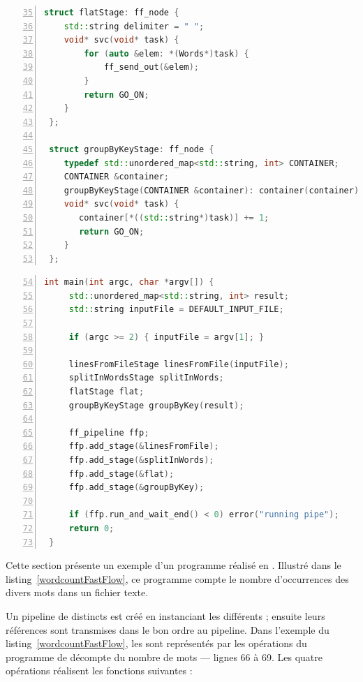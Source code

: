 \begin{lstlisting}[language=c++, frame=single,float,numbers=left,firstnumber=35]
 struct flatStage: ff_node {
    std::string delimiter = " ";
    void* svc(void* task) {
        for (auto &elem: *(Words*)task) {
            ff_send_out(&elem);
        }
        return GO_ON;
    }
 };
 
 struct groupByKeyStage: ff_node {
    typedef std::unordered_map<std::string, int> CONTAINER;
    CONTAINER &container;
    groupByKeyStage(CONTAINER &container): container(container){}
    void* svc(void* task) {
       container[*((std::string*)task)] += 1;
       return GO_ON;
    }
 };
\end{lstlisting}
 
\begin{lstlisting}[language=c++, frame=single, float, numbers=left,firstnumber=54]
 int main(int argc, char *argv[]) {
     std::unordered_map<std::string, int> result;
     std::string inputFile = DEFAULT_INPUT_FILE;

     if (argc >= 2) { inputFile = argv[1]; } 

     linesFromFileStage linesFromFile(inputFile);
     splitInWordsStage splitInWords;
     flatStage flat;
     groupByKeyStage groupByKey(result);

     ff_pipeline ffp;
     ffp.add_stage(&linesFromFile);
     ffp.add_stage(&splitInWords);
     ffp.add_stage(&flat);
     ffp.add_stage(&groupByKey);

     if (ffp.run_and_wait_end() < 0) error("running pipe");
     return 0;
 }
\end{lstlisting}

Cette section pr\'esente un exemple d'un programme r\'ealis\'e en . Illustr\'e dans le listing~\ref{wordcountFastFlow}, ce programme compte le nombre d'occurrences des divers mots dans un fichier texte. 

Un {pipeline} de   distincts est cr\'e\'e en instanciant les  diff\'erents ; ensuite leurs r\'ef\'erences sont transmises dans le bon ordre au {pipeline}. Dans l'exemple du listing~\ref{wordcountFastFlow}, les  sont repr\'esent\'es par les op\'erations du programme de d\'ecompte du nombre de mots --- lignes 66 \`a 69.  Les quatre op\'erations r\'ealisent les fonctions suivantes :

